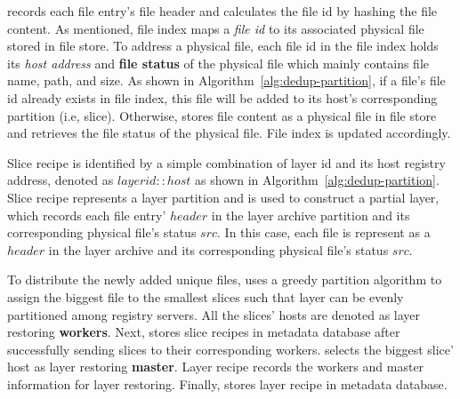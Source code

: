 \sysname records each file entry's file header and 
calculates the file id by hashing the file content.
As mentioned, file index maps a \emph{file id} to its associated physical file stored in file store.
To address a physical file,
each file id in the file index holds its 
\emph{host address} and \textbf{file status} of the physical file which mainly contains file name, path, and size.
As shown in Algorithm~\ref{alg:dedup-partition}, 
if a file's file id already exists in file index, 
this file will be added to its host's corresponding partition (i.e, slice). 
Otherwise,
\sysname stores file content as a physical file in file store
and retrieves the file status of the physical file.
File index is updated accordingly.

Slice recipe is identified by a simple combination of layer id and its host registry address,
denoted as $layerid::host$ as shown in Algorithm~\ref{alg:dedup-partition}.
Slice recipe represents a layer partition and
is used to construct a partial layer,
which
records each file entry' $header$ in the layer archive partition and 
its corresponding physical file's status $src$. 
In this case, 
each file is represent as a $header$ in the layer archive and
its corresponding physical file's status $src$. 




To distribute the newly added unique files,
\sysname uses a greedy partition algorithm to 
assign the biggest file to the smallest slices
such that layer can be evenly partitioned among registry servers.
All the slices' hosts are denoted as layer restoring \textbf{workers}. 
Next, \sysname stores slice recipes in metadata database after successfully
sending slices to their corresponding workers.
\sysname selects the biggest slice' host as layer restoring \textbf{master}.
Layer recipe records the workers and master information for layer restoring.
Finally, \sysname stores layer recipe in metadata database.


